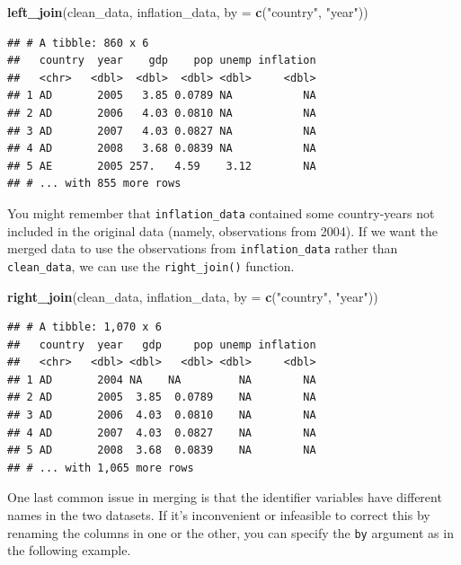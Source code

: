 \documentclass[
  12pt,
  oneside,openany]{book}
\newenvironment{Shaded}{\begin{snugshade}}{\end{snugshade}}
\newcommand{\DataTypeTok}[1]{\textcolor[rgb]{0.13,0.29,0.53}{#1}}
\newcommand{\KeywordTok}[1]{\textcolor[rgb]{0.13,0.29,0.53}{\textbf{#1}}}
\newcommand{\NormalTok}[1]{#1}
\newcommand{\StringTok}[1]{\textcolor[rgb]{0.31,0.60,0.02}{#1}}
\begin{document}
\begin{Shaded}
\begin{Highlighting}[]
\KeywordTok{left\_join}\NormalTok{(clean\_data,}
\NormalTok{          inflation\_data,}
          \DataTypeTok{by =} \KeywordTok{c}\NormalTok{(}\StringTok{"country"}\NormalTok{, }\StringTok{"year"}\NormalTok{))}
\end{Highlighting}
\end{Shaded}

\begin{verbatim}
## # A tibble: 860 x 6
##   country  year    gdp    pop unemp inflation
##   <chr>   <dbl>  <dbl>  <dbl> <dbl>     <dbl>
## 1 AD       2005   3.85 0.0789 NA           NA
## 2 AD       2006   4.03 0.0810 NA           NA
## 3 AD       2007   4.03 0.0827 NA           NA
## 4 AD       2008   3.68 0.0839 NA           NA
## 5 AE       2005 257.   4.59    3.12        NA
## # ... with 855 more rows
\end{verbatim}

You might remember that \texttt{inflation\_data} contained some country-years not included in the original data (namely, observations from 2004). If we want the merged data to use the observations from \texttt{inflation\_data} rather than \texttt{clean\_data}, we can use the \texttt{right\_join()} function.

\begin{Shaded}
\begin{Highlighting}[]
\KeywordTok{right\_join}\NormalTok{(clean\_data,}
\NormalTok{           inflation\_data,}
           \DataTypeTok{by =} \KeywordTok{c}\NormalTok{(}\StringTok{"country"}\NormalTok{, }\StringTok{"year"}\NormalTok{))}
\end{Highlighting}
\end{Shaded}

\begin{verbatim}
## # A tibble: 1,070 x 6
##   country  year   gdp     pop unemp inflation
##   <chr>   <dbl> <dbl>   <dbl> <dbl>     <dbl>
## 1 AD       2004 NA    NA         NA        NA
## 2 AD       2005  3.85  0.0789    NA        NA
## 3 AD       2006  4.03  0.0810    NA        NA
## 4 AD       2007  4.03  0.0827    NA        NA
## 5 AD       2008  3.68  0.0839    NA        NA
## # ... with 1,065 more rows
\end{verbatim}

One last common issue in merging is that the identifier variables have different names in the two datasets. If it's inconvenient or infeasible to correct this by renaming the columns in one or the other, you can specify the \texttt{by} argument as in the following example.
\end{document}
